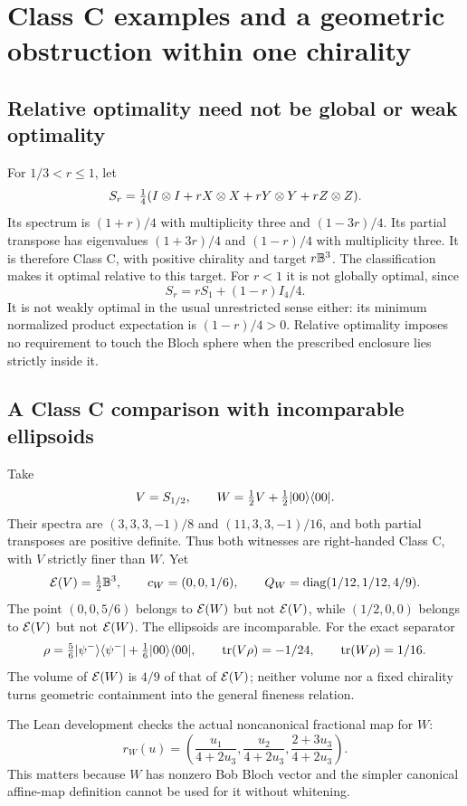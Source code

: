 \section{Class C examples and a geometric obstruction within one chirality}

\subsection{Relative optimality need not be global or weak optimality}

For $1/3<r\leq1$, let
\[
 S_r=\tfrac14(I\otimes I+rX\otimes X+rY\otimes Y+rZ\otimes Z).
\]
Its spectrum is $(1+r)/4$ with multiplicity three and $(1-3r)/4$. Its partial transpose has eigenvalues $(1+3r)/4$ and $(1-r)/4$ with multiplicity three. It is therefore Class C, with positive chirality and target $r\mathbb B^3$. The classification makes it optimal relative to this target. For $r<1$ it is not globally optimal, since
\[
 S_r=rS_1+(1-r)I_4/4.
\]
It is not weakly optimal in the usual unrestricted sense either: its minimum normalized product expectation is $(1-r)/4>0$. Relative optimality imposes no requirement to touch the Bloch sphere when the prescribed enclosure lies strictly inside it.

\subsection{A Class C comparison with incomparable ellipsoids}

Take
\[
 V=S_{1/2},\qquad W=\tfrac12V+\tfrac12\lvert 00\rangle\langle 00\rvert.
\]
Their spectra are $(3,3,3,-1)/8$ and $(11,3,3,-1)/16$, and both partial transposes are positive definite. Thus both witnesses are right-handed Class C, with $V$ strictly finer than $W$. Yet
\[
 \mathcal E(V)=\tfrac12\mathbb B^3,\qquad
 c_W=(0,0,1/6),\qquad Q_W=\operatorname{diag}(1/12,1/12,4/9).
\]
The point $(0,0,5/6)$ belongs to $\mathcal E(W)$ but not $\mathcal E(V)$, while $(1/2,0,0)$ belongs to $\mathcal E(V)$ but not $\mathcal E(W)$. The ellipsoids are incomparable. For the exact separator
\[
 \rho=\tfrac56\lvert \psi^-\rangle\langle \psi^-\rvert+\tfrac16\lvert 00\rangle\langle 00\rvert,
 \qquad\operatorname{tr}(V\rho)=-1/24,\qquad\operatorname{tr}(W\rho)=1/16.
\]
The volume of $\mathcal E(W)$ is $4/9$ of that of $\mathcal E(V)$; neither volume nor a fixed chirality turns geometric containment into the general fineness relation.

The Lean development checks the actual noncanonical fractional map for $W$:
\[
 r_W(u)=\left(\frac{u_1}{4+2u_3},\frac{u_2}{4+2u_3},
                  \frac{2+3u_3}{4+2u_3}\right).
\]
This matters because $W$ has nonzero Bob Bloch vector and the simpler canonical affine-map definition cannot be used for it without whitening.

